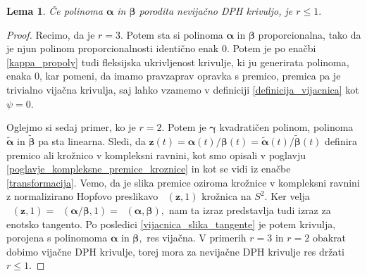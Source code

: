 \documentclass[12pt,a4paper,twoside]{article}
\theoremstyle{definition} %
\theoremstyle{plain} %
\newtheorem{lema}[definicija]{Lema}
\theoremstyle{primerstyle}
\numberwithin{equation}{section}  %
\newcommand{\zV}{\mathbf{z}}
\newcommand{\balpha}{\boldsymbol \alpha}
\newcommand{\bbeta}{\boldsymbol \beta}
\newcommand{\bgamma}{\boldsymbol \gamma}
\newcommand{\btalpha}{\tilde{\boldsymbol \alpha}}
\newcommand{\btbeta}{\tilde{\boldsymbol \beta}}
\DeclareMathOperator{\nhopf}{\hat{H}}
\begin{document}
\begin{lema}
	\label{lema_1}
	Če polinoma $\balpha$ in $\bbeta$ porodita nevijačno DPH krivuljo, je $r \leq 1.$
\end{lema}
\begin{proof}
	Recimo, da je $r=3.$ Potem sta si polinoma $\balpha$ in $\bbeta$ proporcionalna, tako da je njun polinom proporcionalnosti identično enak 0. Potem je po enačbi \eqref{kappa_propoly} tudi fleksijska ukrivljenost krivulje, ki ju generirata polinoma, enaka 0, kar pomeni, da imamo pravzaprav opravka s premico, premica pa je trivialno vijačna krivulja, saj lahko vzamemo v definiciji \ref{definicija_vijacnica} kot $\psi=0.$
	
	Oglejmo si sedaj primer, ko je $r=2.$ Potem je $\bgamma$ kvadratičen polinom, polinoma $\btalpha$ in $\btbeta$ pa sta linearna. Sledi, da $\zV(t)=\balpha(t)/\bbeta(t)=\btalpha(t)/\btbeta(t)$ definira premico ali krožnico v kompleksni ravnini, kot smo opisali v poglavju \ref{poglavje_kompleksne_premice_kroznice} in kot se vidi iz enačbe \eqref{transformacija}. Vemo, da je slika premice oziroma krožnice v kompleksni ravnini z normalizirano Hopfovo preslikavo $\nhopf(\zV,1)$ krožnica na $S^2.$ Ker velja $\nhopf(\zV,1)=\nhopf(\balpha/\bbeta,1)=\nhopf(\balpha,\bbeta),$ nam ta izraz predstavlja tudi izraz za enotsko tangento. Po posledici \ref{vijacnica_slika_tangente} je potem krivulja, porojena s polinomoma $\balpha$ in $\bbeta,$ res vijačna. V primerih $r=3$ in $r=2$ obakrat dobimo vijačne DPH krivulje, torej mora za nevijačne DPH krivulje res držati $r \leq 1.$
\end{proof}
\end{document}
